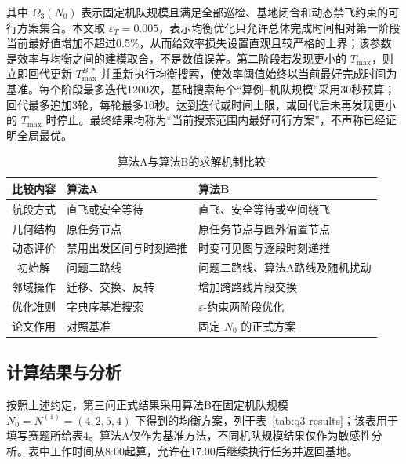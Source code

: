 \documentclass[UTF8,a4paper,12pt]{ctexart}
\numberwithin{equation}{section}
\numberwithin{equation}{section}
\begin{document}
其中 $\Omega_3(N_0)$ 表示固定机队规模且满足全部巡检、基地闭合和动态禁飞约束的可行方案集合。本文取 $\varepsilon_T=0.005$，表示均衡优化只允许总体完成时间相对第一阶段当前最好值增加不超过0.5\%，从而给效率损失设置直观且较严格的上界；该参数是效率与均衡之间的建模取舍，不是数值误差。第二阶段若发现更小的 $T_{\max}$，则立即回代更新 $T_{\max}^{B,*}$ 并重新执行均衡搜索，使效率阈值始终以当前最好完成时间为基准。每个阶段最多迭代1200次，基础搜索每个“算例--机队规模”采用30秒预算；回代最多追加3轮，每轮最多10秒。达到迭代或时间上限，或回代后未再发现更小的 $T_{\max}$ 时停止。最终结果均称为“当前搜索范围内最好可行方案”，不声称已经证明全局最优。

\begin{table}[H]
  \centering
  \caption{算法A与算法B的求解机制比较}
  \label{tab:q3-method-comparison}
  \small
  \begin{tabularx}{0.94\textwidth}{c >{\centering\arraybackslash}X >{\centering\arraybackslash}X}
    \toprule
    比较内容 & 算法A & 算法B \\
    \midrule
    航段方式 & 直飞或安全等待 & 直飞、安全等待或空间绕飞 \\
    几何结构 & 原任务节点 & 原任务节点与圆外偏置节点 \\
    动态评价 & 禁用出发区间与时刻递推 & 时变可见图与逐段时刻递推 \\
    初始解 & 问题二路线 & 问题二路线、算法A路线及随机扰动 \\
    邻域操作 & 迁移、交换、反转 & 增加跨路线片段交换 \\
    优化准则 & 字典序基准搜索 & $\varepsilon$-约束两阶段优化 \\
    论文作用 & 对照基准 & 固定 $N_0$ 的正式方案 \\
    \bottomrule
  \end{tabularx}
\end{table}

\subsection{计算结果与分析}

按照上述约定，第三问正式结果采用算法B在固定机队规模 $N_0=N^{(1)}=(4,2,5,4)$ 下得到的均衡方案，列于表~\ref{tab:q3-results}；该表用于填写赛题所给表4。算法A仅作为基准方法，不同机队规模结果仅作为敏感性分析。表中工作时间从8:00起算，允许在17:00后继续执行任务并返回基地。
\end{document}
